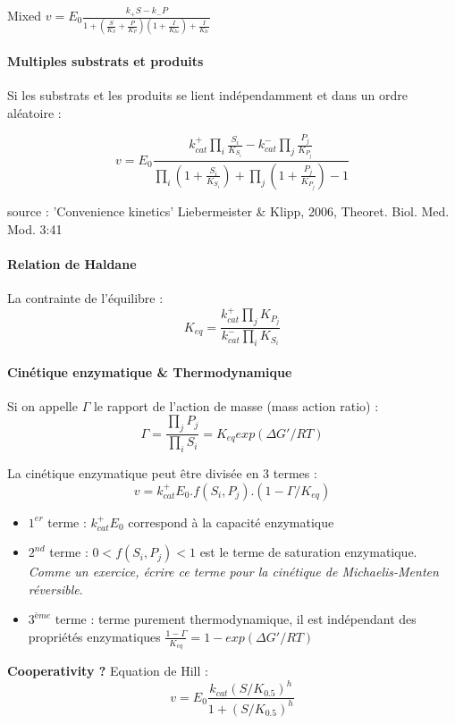 \noindent Mixed
$v=E_0 \frac{k_+S-k_-P}{1+(\frac{S}{K_S}+\frac{P}{K_P})(1+\frac{I}{K_{Iu}})+\frac{I}{K_{Ic}}}$




\paragraph{Multiples substrats et produits}
Si les substrats et les produits se lient indépendamment et dans un ordre aléatoire :

$$v=E_0\frac{k^+_{cat} \prod_{i} \frac{S_i}{K_{S_i}}-k^-_{cat} \prod_{j} \frac{P_j}{K_{P_j}}}{\prod_{i} (1+ \frac{S_i}{K_{S_i}}) + \prod_{j}(1+\frac{P_j}{K_{P_j}})-1}$$


\noindent source : 'Convenience kinetics' Liebermeister \& Klipp, 2006, Theoret. Biol. Med. Mod. 3:41




\paragraph{Relation de Haldane}
La contrainte de l'équilibre : $$K_{eq}=\frac{k^+_{cat} \prod_{j}K_{P_j}}{k^-_{cat} \prod_{i}K_{S_i}}$$


\paragraph{Cinétique enzymatique \& Thermodynamique}
Si on appelle $\Gamma$ le rapport de l'action de masse (mass action ratio) : $$ \Gamma = \frac{\prod_{j}P_j}{\prod_{i}S_i} = K_{eq}exp(\Delta G'/RT)$$

\noindent La cinétique enzymatique peut être divisée en 3 termes : $$v=k^+_{cat}E_0.f(S_i,P_j).(1-\Gamma/K_{eq})$$
\begin{itemize}
\item $1^{er}$ terme : $k^+_{cat}E_0$ correspond à la capacité enzymatique
\item $2^{nd}$ terme : $0 < f(S_i,P_j) < 1$ est le terme de saturation enzymatique. 
\textit{Comme un exercice, écrire ce terme pour la cinétique de Michaelis-Menten réversible}.
\item $3^{ème}$ terme : terme purement thermodynamique, il est indépendant des propriétés enzymatiques $\frac{1-\Gamma}{K_{eq}}=1-exp (\Delta G'/RT)$
\end{itemize}



\textbf{Cooperativity ?}
Equation de Hill : $$v=E_0 \frac{k_{cat}(S/K_{0.5})^h}{1+(S/K_{0.5})^h}$$

